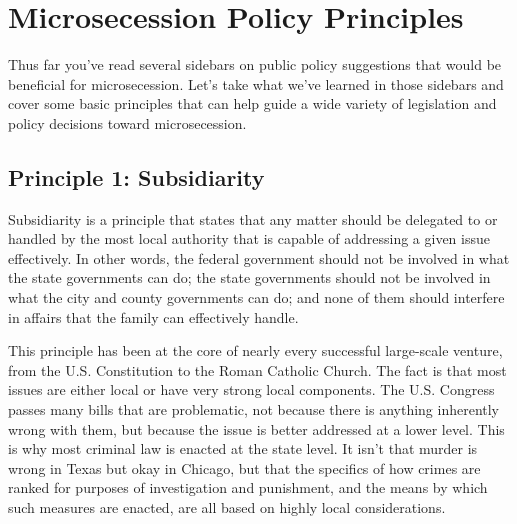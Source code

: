 \chapter{Microsecession Policy Principles}
\label{chap_policy_principles}

Thus far you’ve read
several sidebars on public policy suggestions that would be beneficial
for microsecession.
Let’s take what we’ve
learned in those sidebars and cover some basic principles that can
help guide a wide variety of legislation and policy decisions toward
microsecession.

\section{Principle 1: Subsidiarity}

Subsidiarity is a principle that states that any matter should be
delegated to or handled by the most local authority that is capable of
addressing a given issue effectively. In other words, the federal
government should not be involved in what the state governments can do;
the state governments should not be involved in what the city and
county governments can do;
and none of them
should interfere in affairs that the family can effectively handle.

This principle has been at the core of nearly every successful
large-scale venture, from the U.S. Constitution to the Roman Catholic
Church. The fact is that most issues are either local or have very
strong local components. The U.S. Congress
passes many bills
that are problematic, not because there is anything inherently wrong
with them, but because the issue is better addressed at a lower level.
This is why most criminal law is enacted at the state level. It
isn't
that murder is wrong
in Texas but okay in Chicago, but that the specifics of how crimes are
ranked for purposes of investigation and punishment, and the means by
which such measures are enacted, are all based on highly local
considerations.

